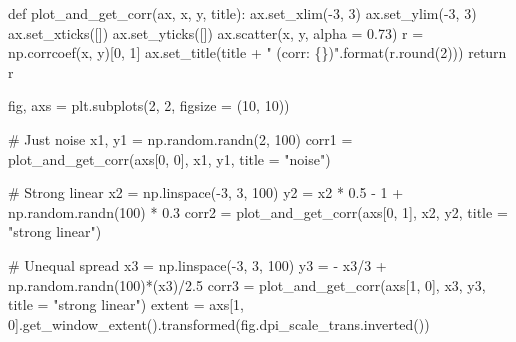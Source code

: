 \documentclass[
  letterpaper,
  DIV=11,
  numbers=noendperiod]{scrreprt}
\newenvironment{Shaded}{\begin{snugshade}}{\end{snugshade}}
\newcommand{\BuiltInTok}[1]{\textcolor[rgb]{0.00,0.23,0.31}{#1}}
\newcommand{\CommentTok}[1]{\textcolor[rgb]{0.37,0.37,0.37}{#1}}
\newcommand{\ControlFlowTok}[1]{\textcolor[rgb]{0.00,0.23,0.31}{#1}}
\newcommand{\DecValTok}[1]{\textcolor[rgb]{0.68,0.00,0.00}{#1}}
\newcommand{\FloatTok}[1]{\textcolor[rgb]{0.68,0.00,0.00}{#1}}
\newcommand{\KeywordTok}[1]{\textcolor[rgb]{0.00,0.23,0.31}{#1}}
\newcommand{\NormalTok}[1]{\textcolor[rgb]{0.00,0.23,0.31}{#1}}
\newcommand{\OperatorTok}[1]{\textcolor[rgb]{0.37,0.37,0.37}{#1}}
\newcommand{\SpecialCharTok}[1]{\textcolor[rgb]{0.37,0.37,0.37}{#1}}
\newcommand{\StringTok}[1]{\textcolor[rgb]{0.13,0.47,0.30}{#1}}
\begin{document}
\begin{Shaded}
\begin{Highlighting}[]
\KeywordTok{def}\NormalTok{ plot\_and\_get\_corr(ax, x, y, title):}
\NormalTok{    ax.set\_xlim(}\OperatorTok{{-}}\DecValTok{3}\NormalTok{, }\DecValTok{3}\NormalTok{)}
\NormalTok{    ax.set\_ylim(}\OperatorTok{{-}}\DecValTok{3}\NormalTok{, }\DecValTok{3}\NormalTok{)}
\NormalTok{    ax.set\_xticks([])}
\NormalTok{    ax.set\_yticks([])}
\NormalTok{    ax.scatter(x, y, alpha }\OperatorTok{=} \FloatTok{0.73}\NormalTok{)}
\NormalTok{    r }\OperatorTok{=}\NormalTok{ np.corrcoef(x, y)[}\DecValTok{0}\NormalTok{, }\DecValTok{1}\NormalTok{]}
\NormalTok{    ax.set\_title(title }\OperatorTok{+} \StringTok{" (corr: }\SpecialCharTok{\{\}}\StringTok{)"}\NormalTok{.}\BuiltInTok{format}\NormalTok{(r.}\BuiltInTok{round}\NormalTok{(}\DecValTok{2}\NormalTok{)))}
    \ControlFlowTok{return}\NormalTok{ r}

\NormalTok{fig, axs }\OperatorTok{=}\NormalTok{ plt.subplots(}\DecValTok{2}\NormalTok{, }\DecValTok{2}\NormalTok{, figsize }\OperatorTok{=}\NormalTok{ (}\DecValTok{10}\NormalTok{, }\DecValTok{10}\NormalTok{))}

\CommentTok{\# Just noise}
\NormalTok{x1, y1 }\OperatorTok{=}\NormalTok{ np.random.randn(}\DecValTok{2}\NormalTok{, }\DecValTok{100}\NormalTok{)}
\NormalTok{corr1 }\OperatorTok{=}\NormalTok{ plot\_and\_get\_corr(axs[}\DecValTok{0}\NormalTok{, }\DecValTok{0}\NormalTok{], x1, y1, title }\OperatorTok{=} \StringTok{"noise"}\NormalTok{)}

\CommentTok{\# Strong linear}
\NormalTok{x2 }\OperatorTok{=}\NormalTok{ np.linspace(}\OperatorTok{{-}}\DecValTok{3}\NormalTok{, }\DecValTok{3}\NormalTok{, }\DecValTok{100}\NormalTok{)}
\NormalTok{y2 }\OperatorTok{=}\NormalTok{ x2 }\OperatorTok{*} \FloatTok{0.5} \OperatorTok{{-}} \DecValTok{1} \OperatorTok{+}\NormalTok{ np.random.randn(}\DecValTok{100}\NormalTok{) }\OperatorTok{*} \FloatTok{0.3}
\NormalTok{corr2 }\OperatorTok{=}\NormalTok{ plot\_and\_get\_corr(axs[}\DecValTok{0}\NormalTok{, }\DecValTok{1}\NormalTok{], x2, y2, title }\OperatorTok{=} \StringTok{"strong linear"}\NormalTok{)}

\CommentTok{\# Unequal spread}
\NormalTok{x3 }\OperatorTok{=}\NormalTok{ np.linspace(}\OperatorTok{{-}}\DecValTok{3}\NormalTok{, }\DecValTok{3}\NormalTok{, }\DecValTok{100}\NormalTok{)}
\NormalTok{y3 }\OperatorTok{=} \OperatorTok{{-}}\NormalTok{ x3}\OperatorTok{/}\DecValTok{3} \OperatorTok{+}\NormalTok{ np.random.randn(}\DecValTok{100}\NormalTok{)}\OperatorTok{*}\NormalTok{(x3)}\OperatorTok{/}\FloatTok{2.5}
\NormalTok{corr3 }\OperatorTok{=}\NormalTok{ plot\_and\_get\_corr(axs[}\DecValTok{1}\NormalTok{, }\DecValTok{0}\NormalTok{], x3, y3, title }\OperatorTok{=} \StringTok{"strong linear"}\NormalTok{)}
\NormalTok{extent }\OperatorTok{=}\NormalTok{ axs[}\DecValTok{1}\NormalTok{, }\DecValTok{0}\NormalTok{].get\_window\_extent().transformed(fig.dpi\_scale\_trans.inverted())}


\end{Highlighting}
\end{Shaded}
\end{document}
